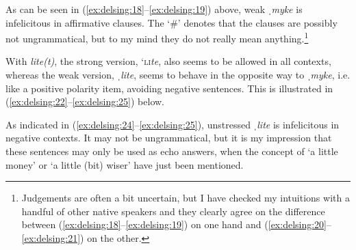 \documentclass[output=paper]{langscibook}
\begin{document}
\begin{sloppypar}
As can be seen in (\ref{ex:delsing:18}–\ref{ex:delsing:19}) above, weak \textit{ˌmyke} is infelicitous in affirmative clauses. The ‘\#’ denotes that the clauses are possibly not ungrammatical, but to my mind they do not really mean anything.\footnote{Judgements are often a bit uncertain, but I have checked my intuitions with a handful of other native speakers and they clearly agree on the difference between (\ref{ex:delsing:18}--\ref{ex:delsing:19}) on one hand and (\ref{ex:delsing:20}--\ref{ex:delsing:21}) on the other.}
\end{sloppypar}



With \textit{lite(t)}, the strong version, ‘\textsc{li}\textit{te}, also seems to be allowed in all contexts, whereas the weak version, \textit{ˌlite}, seems to behave in the opposite way to \textit{ˌmyke}, i.e. like a positive polarity item, avoiding negative sentences. This is illustrated in (\ref{ex:delsing:22}--\ref{ex:delsing:25}) below.

{\judgewidth{\#}
\z}


As indicated in (\ref{ex:delsing:24}--\ref{ex:delsing:25}), unstressed \textit{ˌlite} is infelicitous in negative contexts. It may not be ungrammatical, but it is my impression that these sentences may only be used as echo answers, when the concept of ‘a little money’ or ‘a little (bit) wiser’ have just been mentioned.
\end{document}
